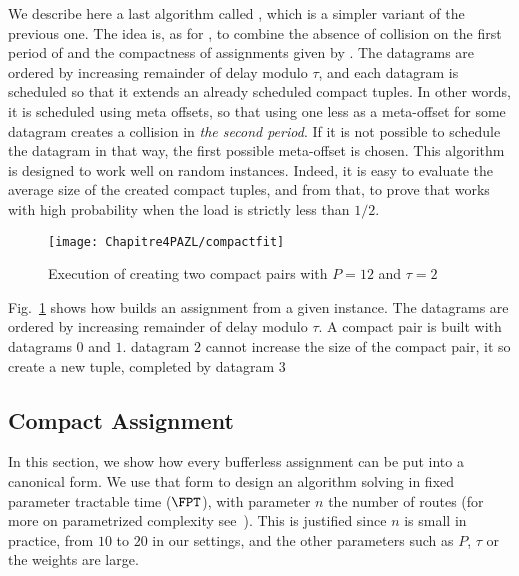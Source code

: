 We describe here a last algorithm called \compactfit, which is a simpler variant of the previous one. The idea is, as for \compactpair, to combine the absence of collision on the first period of \metaoffset and the compactness of assignments given by \firstfit.
The datagrams are ordered by increasing remainder of delay modulo $\tau$, and each datagram is scheduled so that 
it extends an already scheduled compact tuples. In other words, it is scheduled using meta offsets, so that using one less as a meta-offset for some datagram creates a collision in \emph{the second period}. If it is not possible to schedule the datagram in that way, the first possible meta-offset is chosen. This algorithm is designed to work well on random instances. Indeed, it 
is easy to evaluate the average size of the created compact tuples, and from that, to prove that \compactfit works with high probability when the load is strictly less than $1/2$.
\begin{figure}[h]
 \begin{center}
\texttt{[image: Chapitre4PAZL/compactfit]}
\end{center}
\caption{Execution of \compactfit creating two compact pairs with $P=12$ and $\tau =2$}
\label{fig:compactfit}
\end{figure}
Fig.~\ref{fig:compactfit} shows how \compactfit builds an assignment from a given instance. The datagrams are ordered by increasing remainder of delay modulo $\tau$. A compact pair is built with datagrams $0$ and $1$. datagram $2$ cannot increase the size of the compact pair, it so create a new tuple, completed by datagram $3$



\subsection{Compact Assignment}

In this section, we show how every bufferless assignment can be put into a canonical form.
We use that form to design an algorithm solving \pazl in fixed parameter tractable time ($\FPT$), with parameter $n$ the number of routes (for more on parametrized complexity see~\cite{downey2012parameterized}). This is justified since $n$ is small in practice, from $10$ to $20$ in our settings, and the other parameters such as $P$, $\tau$ or the weights are large.

